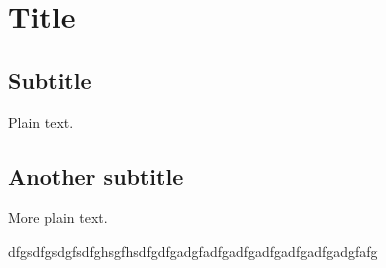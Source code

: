 \documentclass{article}
\begin{document}
\section{Title}

\subsection{Subtitle}

Plain text.

\subsection{Another subtitle}

More plain text.


dfgsdfgsdgfsdfghsgfhsdfgdfgadgfadfgadfgadfgadfgadfgadgfafg
\end{document}
